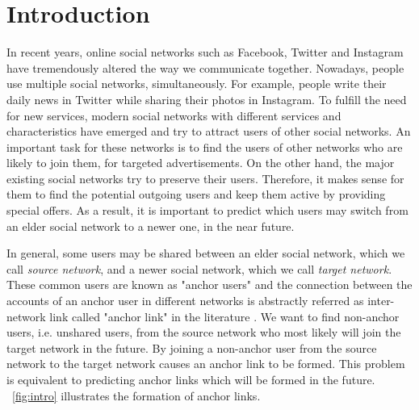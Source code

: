 \documentclass[conference]{IEEEtran}
\begin{document}
\section{Introduction}
In recent years, online social networks such as Facebook, Twitter and Instagram have tremendously altered the way we communicate together. Nowadays, people use multiple social networks, simultaneously. For example, people write their daily news in Twitter while sharing their photos in Instagram. To fulfill the need for new services, modern social networks with different services and characteristics have emerged and try to attract users of other social networks. An important task for these networks is to find the users of other networks who are likely to join them, for targeted advertisements. On the other hand, the major existing social networks try to preserve their users. Therefore, it makes sense for them to find the potential outgoing users and keep them active by providing special offers. As a result, it is important to predict which users may switch from an elder social network to a newer one, in the near future.

In general, some users may be shared between an elder social network, which we call \textit{source network}, and a newer social network, which we call \textit{target network}. These common users are known as "anchor users" and the connection between the accounts of an anchor user in different networks is abstractly referred as inter-network link called "anchor link" in the literature \cite{kong2013}. We want to find non-anchor users, i.e. unshared users, from the source network who most likely will join the target network in the future. By joining a non-anchor user from the source network to the target network causes an anchor link to be formed. This problem is equivalent to predicting anchor links which will be formed in the future. \figurename~\ref{fig:intro} illustrates the formation of anchor links.
\end{document}
